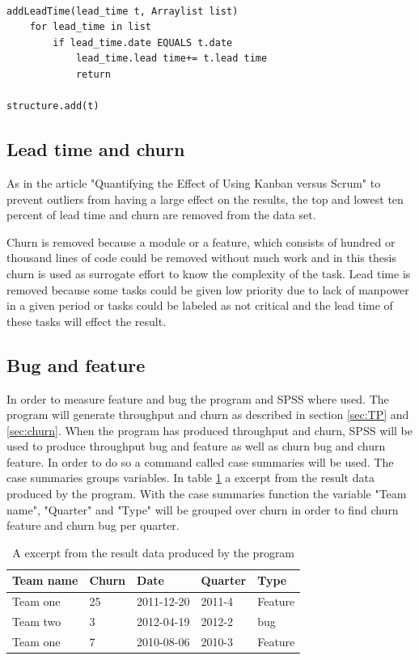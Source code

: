 \documentclass[UKenglish]{ifimaster}  %
\begin{document}
\begin{minipage}{\textwidth}
\begin{lstlisting}[caption=Pseudocode example of lead time is measured, label=LTcode]

addLeadTime(lead_time t, Arraylist list)
	for lead_time in list
		if lead_time.date EQUALS t.date
			lead_time.lead time+= t.lead time
			return
			
structure.add(t)
\end{lstlisting}
\end{minipage}
\subsection{Lead time and churn}
As in the article "Quantifying the Effect of Using Kanban versus Scrum" \parencite{Dag} to prevent outliers from having a large effect on the results, the top and lowest ten percent of lead time and churn are removed from the data set.

Churn is removed because a module or a feature, which consists of hundred or thousand lines of code could be removed without much work and in this thesis churn is used as surrogate effort to know the complexity of the task. Lead time is removed because some tasks could be given low priority due to lack of manpower in a given period or tasks could be labeled as not critical and the lead time of these tasks will effect the result.

\subsection {Bug and feature}
\label{sec:bug}
In order to measure feature and bug the program and SPSS where used. The program will generate throughput and churn as described in section \ref{sec:TP} and \ref{sec:churn}. When the program has produced throughput and churn, SPSS will be used to produce throughput bug and feature as well as churn bug and churn feature. In order to do so a command called case summaries will be used. The case summaries groups variables. In table \ref{tab:ftb} a excerpt from the result data produced by the program.  With the case summaries function the variable "Team name", "Quarter" and "Type" will be grouped over churn in order to find churn feature and churn bug per quarter. 

\newpage
\begin{table}[!ht]
\center
\begin{tabular}{ | l | l | l | l | l | }
\hline
	\bf{Team name} & \bf{Churn} & \bf{Date} & \bf{Quarte}r & \bf{Type} \\ \hline
	Team one & 25 &2011-12-20& 2011-4 & Feature \\ \hline
	Team two & 3 &2012-04-19 & 2012-2 & bug \\ \hline
	Team one & 7 & 2010-08-06 & 2010-3 & Feature \\ \hline
\end{tabular}
\caption{A excerpt from the result data produced by the program }
\label{tab:ftb} 
\end{table}
\end{document}
